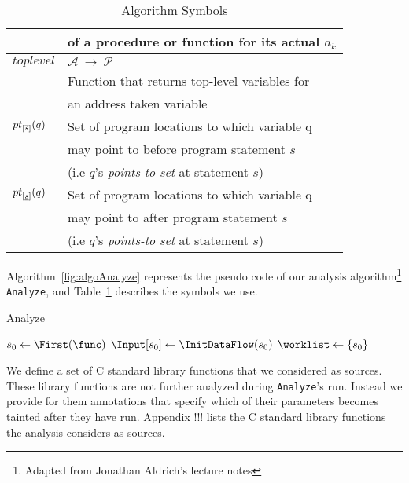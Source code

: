 \begin{table}
\begin{tabular}{|l|l|}
								&	of a procedure or function for its actual $a_k$		\\ \hline	
$\mathit{toplevel}$				&	$\mathcal{A}\ \rightarrow\ \mathcal{P}$ 			\\
								& 	Function that returns top-level variables for		\\
								&	an address taken variable							\\ \hline															
${pt}_{[\overline{s}]}(q)$	&	Set of program locations to which variable q		\\
								&	may point to before program statement $s$			\\
								& 	(i.e $q$'s \textit{points-to set} at statement $s$)	\\ \hline					
${pt}_{[\underline{s}]}(q)$	&	Set of program locations to which variable q		\\
								&	may point to after program statement $s$			\\
								& 	(i.e $q$'s \textit{points-to set} at statement $s$)	\\ \hline
\end{tabular}
\caption{Algorithm Symbols}\label{symTable}
\end{table}
Algorithm~\ref{fig:algoAnalyze} represents the pseudo code of
our analysis algorithm\footnote{Adapted from Jonathan Aldrich's
lecture notes} \texttt{Analyze}, and Table~\ref{symTable}
describes the symbols we use.

\IncMargin{1em}
\begin{algorithm}
\caption{Analyze}\label{fig:algoAnalyze}
\SetAlgoLined
\LinesNumbered
\DontPrintSemicolon
{}


\OutData{}
$ s_0 \leftarrow \First(\func)$\;
$\Input[s_0] \leftarrow \InitDataFlow(s_0)$\;
$\worklist \leftarrow \set{s_0}$\;
\While{ $\worklist\ \neq\ \emptyset$ }{
	$\varI \leftarrow \Next(\worklist)$\;
	$\Output[i] \leftarrow \InterFlow(\AnalyzeAlgo, \varI)$\;
	\ForEach{ $\varJ \in \Succs(\varI)$ }{
		\If{ $\Output[\varI] \not\sqsubseteq \Input[\varJ]$}{
			$\Input[\varJ] \leftarrow \Input[\varJ] \sqcup \Output[\varI]$\;
			$\worklist \leftarrow \worklist \cup\ \set{\varJ}$\;
		}	
	}
}
\end{algorithm}
\DecMargin{1em}
We define a set of C standard library functions that
we considered as sources. These library functions are not
further analyzed during \texttt{Analyze}'s run.
Instead we provide for them annotations that specify
which of their parameters becomes tainted after they
have run. Appendix !!! lists the C standard library
functions the analysis considers as sources.

